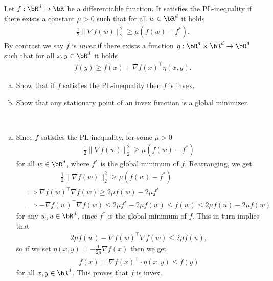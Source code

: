 \begin{homework}[e]
  \prob Let $f:\bR^d \to \bR$ be a differentiable function. It satisfies the PL-inequality if there exists a constant $\mu > 0$ such that for all $w \in \bR^d$ it holds
  \begin{align*}
    \frac{1}{2}\|\nabla f(w)\|^2_2 \geq \mu(f(w) - f^*).
  \end{align*}
  By contrast we say $f$ is \emph{invex} if there exists a function $\eta:\bR^d\times \bR^d\to \bR^d$ such that for all $x, y\in \bR^d$ it holds
  \begin{align*}
    f(y) \geq f(x) + \nabla f(x)^\top \eta(x,y).
  \end{align*}
  \begin{enumerate}[(a)]
    \item Show that if $f$ satisfies the PL-inequality then $f$ is invex.
    \item Show that any stationary point of an invex function is a global minimizer.
  \end{enumerate}
  \begin{prf}$ $
    \begin{enumerate}[(a)]
      \item Since $f$ satisfies the PL-inequality, for some $\mu > 0$
        \begin{align*} 
          \frac{1}{2}\|\nabla f(w)\|^2_2 \geq \mu(f(w) - f^*)
        \end{align*}
        for all $w\in \bR^d$, where $f^*$ is the global minimum of $f$. Rearranging, we get
        \begin{align*}
          &\hspace{5em}\frac{1}{2}\|\nabla f(w)\|^2_2 \geq \mu(f(w) - f^*) \\
            &\implies \nabla f(w)^\top \nabla f(w) \geq 2\mu f(w) - 2\mu f^* \\
            &\implies - \nabla f(w)^\top \nabla f(w) \leq 2\mu f^* - 2\mu f(w) \leq f(w) \leq 2\mu f(u) - 2\mu f(w)
        \end{align*}
        for any $w, u\in \bR^d$, since $f^*$ is the global minimum of $f$. This in turn implies that
        \begin{align*}
          2\mu f(w) - \nabla f(w)^\top \nabla f(w) \leq 2\mu f(u),
        \end{align*}
        so if we set $\eta(x,y) = - \frac{1}{2\mu}\nabla f(x)$ then we get
        \begin{align*}
          f(x) = \nabla f(x)^\top \cdot \eta(x,y) \leq f(y)
        \end{align*}
        for all $x, y\in \bR^d$. This proves that $f$ is invex.


\end{enumerate}
\end{prf}
\end{homework}
